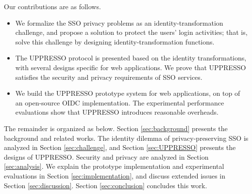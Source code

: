 %
%
Our contributions are as follows.
\vspace{-\topsep}\begin{itemize}
\setlength{\topsep}{0pt}
\setlength{\partopsep}{0pt}
\setlength{\itemsep}{0pt}
\setlength{\parsep}{0pt}
\setlength{\parskip}{0pt}
\item We formalize the SSO privacy problems as an identity-transformation challenge,
    and
propose a  solution to protect the users' login activities;
    that is, solve this challenge by designing identity-transformation functions.
\item
The UPPRESSO protocol is presented based on the identity transformations,
    with several designs specific for web applications.
We prove that UPPRESSO satisfies the security and privacy requirements of SSO services.


\item
We build the UPPRESSO prototype system for web applications,
    on top of an open-source OIDC implementation.
The experimental performance evaluations show that UPPRESSO introduces reasonable overheads.
\end{itemize}


The remainder is organized as below.
Section \ref{sec:background} presents
    the background and related works.
The identity dilemma of privacy-preserving SSO is analyzed  in Section \ref{sec:challenge},
    and Section \ref{sec:UPPRESSO} presents the designs of UPPRESSO.
Security and privacy are analyzed in Section \ref{sec:analysis}.
We explain the prototype implementation and experimental evaluations in Section \ref{sec:implementation},
 and discuss extended issues in Section \ref{sec:discussion}.
Section \ref{sec:conclusion} concludes this work.

